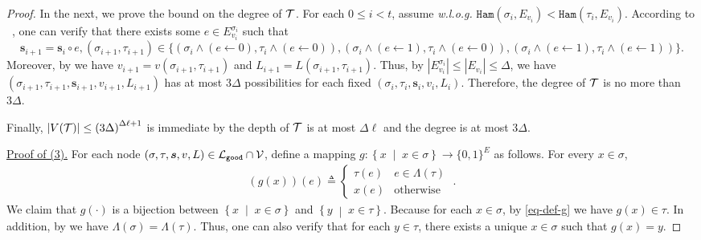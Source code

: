 \documentclass[11pt]{article}
\newcommand{\abs}[1]{\left\vert#1\right\vert}
\renewcommand{\mid}{\;\middle\vert\;} \newcommand{\cmid}{\,:\,}
\def\!#1{\mathtt{#1}}
\newcommand{\seqS}{\boldsymbol{s}}
\begin{document}
\begin{proof}
    
    In the next, we prove the bound on the degree of $\mathcal{T}$.
    For each $0\leq i <t$, assume \emph{w.l.o.g.} ${\!{Ham}\left(\sigma_i,{E_{v_i}}\right)}<{\!{Ham}\left(\tau_i,{E_{v_i}}\right)}$.
    According to ~,     
    one can verify that there exists some $e\in E^{\sigma_i}_{v_i}$ such that
    \[\seqS_{i+1} = \seqS_{i}\circ e, (\sigma_{i+1},\tau_{i+1})\in \{(\sigma_i\land(e\leftarrow 0),\tau_i\land(e\leftarrow 0)),(\sigma_i\land(e\leftarrow 1),\tau_i\land(e\leftarrow 0)),(\sigma_i\land(e\leftarrow 1),\tau_i\land(e\leftarrow 1))\}.\]
    Moreover, by  we have $v_{i+1} = v(\sigma_{i+1},\tau_{i+1})$ and
    $L_{i+1} = L(\sigma_{i+1},\tau_{i+1})$.
    Thus, by $\abs{E^{\sigma_i}_{v_i}}\leq \abs{E_{v_i}}\leq \Delta$, we have $(\sigma_{i+1},\tau_{i+1},\seqS_{i+1},v_{i+1},L_{i+1})$ has at most $3\Delta$ possibilities for each fixed  $(\sigma_{i},\tau_{i},\seqS_{i},v_{i},L_{i})$.
    Therefore, the degree of $\mathcal{T}$ is no more than $3\Delta$.
    
    Finally, $\abs{V(\+T)}\leq \left(3\Delta\right)^{\Delta \ell + 1}$ is immediate by the depth of $\mathcal{T}$ is at most $\Delta \ell$ and the degree is at most $3\Delta$.
 
    \vspace{0.2cm}
    \underline{Proof of (3).} For each node $(\sigma, \tau, \seqS,v,L) \in \+L_{\!{good}}\cap \+V$, 
    define a mapping $g:\left\{x\mid x\in \sigma\right\}\rightarrow \{0,1\}^E$ as follows.
    For every $x \in \sigma$, 
    \begin{align}\label{eq-def-g}
        (g(x))(e) \triangleq \begin{cases}
            \tau(e) & e \in \Lambda(\tau) \\
             x(e)& \mbox{otherwise}
        \end{cases}\;.
    \end{align}
    We claim that $g(\cdot)$ is a bijection between $\left\{x\mid x\in\sigma\right\}$ and $\left\{y\mid x\in\tau\right\}$.
    Because for each $x\in \sigma$, by \eqref{eq-def-g} we have $g(x)\in \tau$.
    In addition, by  we have $\Lambda(\sigma) = \Lambda(\tau)$. 
    Thus, one can also verify that for each $y\in \tau$, there exists a unique $x\in \sigma$ such that $g(x) = y$.  


\end{proof}
\end{document}
